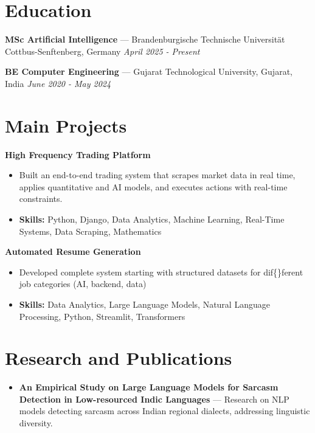 \documentclass[a4paper,10pt]{article}
\begin{document}
\section*{Education}
\textbf{MSc Artificial Intelligence} — Brandenburgische Technische Universität Cottbus-Senftenberg, Germany \hfill \textit{April 2025 - Present}\par
\vspace{1.5pt}
\textbf{BE Computer Engineering} — Gujarat Technological University, Gujarat, India \hfill \textit{June 2020 - May 2024}\par

\section*{Main Projects}
\textbf{High Frequency Trading Platform}\par
\vspace{1pt}
\begin{itemize}
  \item Built an end-to-end trading system that scrapes market data in real time, applies quantitative and AI models, and executes actions with real-time constraints.
  \item \textbf{Skills:} Python, Django, Data Analytics, Machine Learning, Real-Time Systems, Data Scraping, Mathematics
\end{itemize}
\vspace{3pt}
\textbf{Automated Resume Generation}\par
\vspace{1pt}
\begin{itemize}
  \item Developed complete system starting with structured datasets for dif\{\}ferent job categories (AI, backend, data)
  \item \textbf{Skills:} Data Analytics, Large Language Models, Natural Language Processing, Python, Streamlit, Transformers
\end{itemize}

\section*{Research and Publications}
\begin{itemize}
\item \textbf{An Empirical Study on Large Language Models for Sarcasm Detection in Low-resourced Indic Languages} — Research on NLP models detecting sarcasm across Indian regional dialects, addressing linguistic diversity.
\end{itemize}
\end{document}
